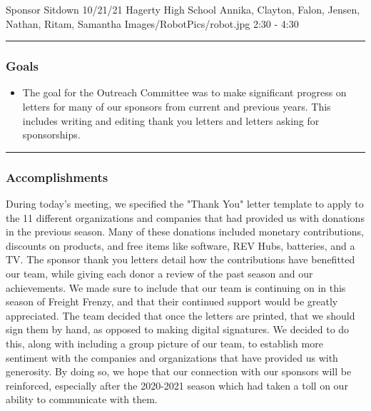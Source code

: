 \insertmeeting 
	{Sponsor Sitdown} 
	{10/21/21}
	{Hagerty High School}
	{Annika, Clayton, Falon, Jensen, Nathan, Ritam, Samantha}
	{Images/RobotPics/robot.jpg}
	{2:30 - 4:30}
	
\noindent\hfil\rule{\textwidth}{.4pt}\hfil
\subsubsection*{Goals}
\begin{itemize}
    \item The goal for the Outreach Committee was to make significant progress on letters for many of our sponsors from current and previous years. This includes writing and editing thank you letters and letters asking for sponsorships. 

\end{itemize} 

\noindent\hfil\rule{\textwidth}{.4pt}\hfil

\subsubsection*{Accomplishments}
During today's meeting, we specified the "Thank You" letter template to apply to the 11 different organizations and companies that had provided us with donations in the previous season. Many of these donations included monetary contributions, discounts on products, and free items like software, REV Hubs, batteries, and a TV. The sponsor thank you letters detail how the contributions have benefitted our team, while giving each donor a review of the past season and our achievements. We made sure to include that our team is continuing on in this season of Freight Frenzy, and that their continued support would be greatly appreciated. The team decided that once the letters are printed, that we should sign them by hand, as opposed to making digital signatures. We decided to do this, along with including a group picture of our team, to establish more sentiment with the companies and organizations that have provided us with generosity. By doing so, we hope that our connection with our sponsors will be reinforced, especially after the 2020-2021 season which had taken a toll on our ability to communicate with them.

